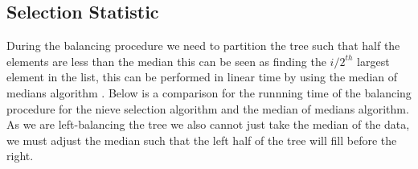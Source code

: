 \subsection{Selection Statistic}
During the balancing procedure we need to partition the tree such that half the elements are less than the median
this can be seen as finding the $i/2^{th}$ largest element in the list, this can be performed in linear time by using
the median of medians algorithm . Below is a comparison for the runnning time of the balancing procedure for
the nieve selection algorithm and the median of medians algorithm. As we are left-balancing the tree we also cannot
just take the median of the data, we must adjust the median such that the left half of the tree will fill before the right.


